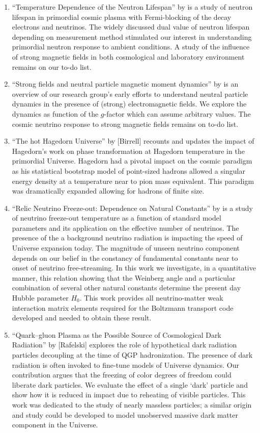 \begin{enumerate}
%
\item ``Temperature Dependence of the Neutron Lifespan'' by  is a study of neutron lifespan in primordial cosmic plasma with Fermi-blocking of the decay electrons and neutrinos. {\color{blue} The widely discussed dual value of neutron lifespan depending on measurement method stimulated our interest in understanding primordial neutron response to ambient conditions. A study of the influence of strong magnetic fields in both cosmological and laboratory environment remains on our to-do list.}
%
\item ``Strong fields and neutral particle magnetic moment dynamics'' by  is an overview of our research group's early efforts to understand neutral particle dynamics in the presence of (strong) electromagnetic fields. {\color{blue} We explore the dynamics as function of the $g$-factor which can assume arbitrary values. The cosmic neutrino response to strong magnetic fields remains on to-do list.}
%
\item ``The hot Hagedorn Universe'' by [Birrell] {\color{blue} recounts and updates the impact of Hagedorn's work on phase transformation at Hagedorn temperature in the primordial Universe. Hagedorn had a pivotal impact on the cosmic paradigm as his statistical bootstrap model of point-sized hadrons allowed a singular energy density at a temperature near to pion mass equivalent. This paradigm was dramatically expanded allowing for hadrons of finite size.}
%
\item ``Relic Neutrino Freeze-out: Dependence on Natural Constants'' by  is a study of neutrino freeze-out temperature as a function of standard model parameters and its application on the effective number of neutrinos. {\color{blue} The presence of the a background neutrino radiation is impacting the speed of Universe expansion today. The magnitude of unseen neutrino component depends on our belief in the constancy of fundamental constants near to onset of neutrino free-streaming. In this work we investigate, in a quantitative manner, this relation showing  that the Weinberg angle and a particular combination of several other natural constants determine the present day Hubble parameter $H_0$. This work provides all neutrino-matter weak interaction matrix elements required for the Boltzmann transport code developed and needed to obtain these result.}
%
\item ``Quark–gluon Plasma as the Possible Source of Cosmological Dark Radiation'' by [Rafelski] {\color{blue} explores the role of hypothetical dark radiation particles decoupling at the time of QGP hadronization. The presence of dark radiation is often invoked to fine-tune models of Universe dynamics. Our contribution argues that the freezing of color degrees of freedom could liberate dark particles. We evaluate the effect of a single `dark' particle and show how it is reduced in impact due to reheating of visible particles. This work was dedicated to the study of nearly massless particles; a similar origin and study could be developed to model unobserved massive dark matter component in the Universe. }

\end{enumerate}
